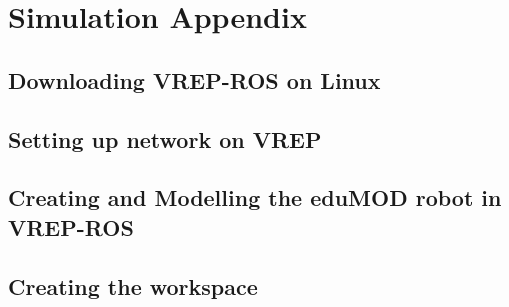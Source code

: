 \chapter{Simulation Appendix}
\label{ch:Appendix-Simulation} 
\section{Downloading VREP-ROS on Linux}

\section{Setting up network on VREP}

\section{Creating and Modelling the eduMOD robot in VREP-ROS}

\section{Creating the workspace} 


